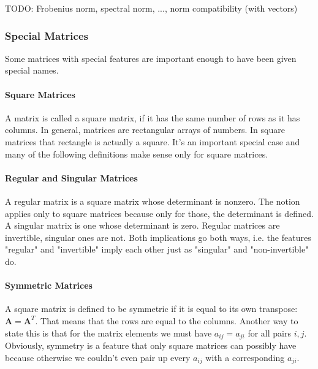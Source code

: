 TODO: Frobenius norm, spectral norm, ..., norm compatibility (with vectors)




\subsubsection{Special Matrices} %
Some matrices with special features are important enough to have been given special names.




\paragraph{Square Matrices}
A matrix is called a square matrix, if it has the same number of rows as it has columns. In general, matrices are rectangular arrays of numbers. In square matrices that rectangle is actually a square. It's an important special case and many of the following definitions make sense only for square matrices.

\paragraph{Regular and Singular Matrices}
A regular matrix is a square matrix whose determinant is nonzero. The notion applies only to square matrices because only for those, the determinant is defined. A singular matrix is one whose determinant is zero. Regular matrices are invertible, singular ones are not. Both implications go both ways, i.e. the features "regular" and "invertible" imply each other just as "singular" and "non-invertible" do. %


\paragraph{Symmetric Matrices}
A square matrix is defined to be symmetric if it is equal to its own transpose: $\mathbf{A} = \mathbf{A}^T$. That means that the rows are equal to the columns. Another way to state this is that for the matrix elements we must have $a_{ij} = a_{ji}$ for all pairs $i,j$. Obviously, symmetry is a feature that only square matrices can possibly have because otherwise we couldn't even pair up every $a_{ij}$ with a corresponding $a_{ji}$.

